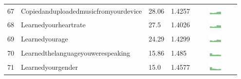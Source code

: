 \documentclass[a4paper,12pt]{article}
\begin{document}
\begin{longtable}{| p{0.5cm} | p{7cm} | p{1cm} |p{1cm} | c |}
67 & Copiedanduploadedmusicfromyourdevice & 28.06&1.4257 & \includegraphics[width = 2cm, height = 0.5cm]{tables/copiedanduploadedmusicfromyourdevicecombined} \\ 
68 & Learnedyourheartrate & 27.5&1.4026 & \includegraphics[width = 2cm, height = 0.5cm]{tables/learnedyourheartratecombined} \\ 
69 & Learnedyourage & 24.29&1.4299 & \includegraphics[width = 2cm, height = 0.5cm]{tables/learnedyouragecombined} \\ 
70 & Learnedthelanguageyouwerespeaking & 15.86&1.485 & \includegraphics[width = 2cm, height = 0.5cm]{tables/learnedthelanguageyouwerespeakingcombined} \\ 
71 & Learnedyourgender & 15.0&1.4577 & \includegraphics[width = 2cm, height = 0.5cm]{tables/learnedyourgendercombined} \\ 
\end{longtable}
\end{document}
